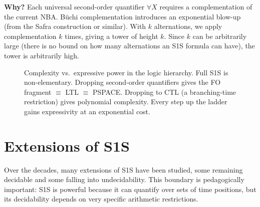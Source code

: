 \medskip\noindent
\textbf{Why?}  Each universal second-order quantifier $\forall X$ requires
a complementation of the current NBA.  Büchi complementation introduces an
exponential blow-up (from the Safra construction or similar).  With $k$
alternations, we apply complementation $k$ times, giving a tower of height
$k$.  Since $k$ can be arbitrarily large (there is no bound on how many
alternations an S1S formula can have), the tower is arbitrarily high.

\begin{figure}[ht]
  \centering
  \caption{Complexity vs.\ expressive power in the logic hierarchy.
           Full S1S is non-elementary.  Dropping second-order quantifiers
           gives the FO fragment $\equiv$ LTL $\equiv$ PSPACE.  Dropping
           to CTL (a branching-time restriction) gives polynomial complexity.
           Every step up the ladder gains expressivity at an exponential
           cost.}
  \label{fig:complexity-hierarchy}
\end{figure}

\section{Extensions of S1S}
\label{sec:s1s-extensions}

Over the decades, many extensions of S1S have been studied, some
remaining decidable and some falling into undecidability.
This boundary is pedagogically important: S1S is powerful because it can
quantify over sets of time positions, but its decidability depends on very
specific arithmetic restrictions.


